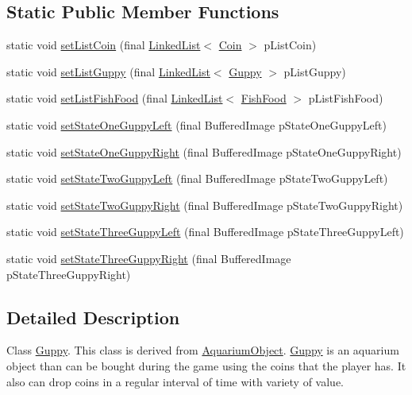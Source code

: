\subsection*{Static Public Member Functions}
\begin{DoxyCompactItemize}
\item 
static void \mbox{\hyperlink{class_guppy_a46004a42a6bea1e8fce0f26a61351d17}{set\+List\+Coin}} (final \mbox{\hyperlink{class_linked_list}{Linked\+List}}$<$ \mbox{\hyperlink{class_coin}{Coin}} $>$ p\+List\+Coin)
\item 
static void \mbox{\hyperlink{class_guppy_a87b2657fb98da613855fc016efa5e9d5}{set\+List\+Guppy}} (final \mbox{\hyperlink{class_linked_list}{Linked\+List}}$<$ \mbox{\hyperlink{class_guppy}{Guppy}} $>$ p\+List\+Guppy)
\item 
static void \mbox{\hyperlink{class_guppy_acc235342cdaa86c847ab01eb55043d7e}{set\+List\+Fish\+Food}} (final \mbox{\hyperlink{class_linked_list}{Linked\+List}}$<$ \mbox{\hyperlink{class_fish_food}{Fish\+Food}} $>$ p\+List\+Fish\+Food)
\item 
static void \mbox{\hyperlink{class_guppy_a9a8f6225f0482e0bd57a81f51310257c}{set\+State\+One\+Guppy\+Left}} (final Buffered\+Image p\+State\+One\+Guppy\+Left)
\item 
static void \mbox{\hyperlink{class_guppy_a49fdfd0f9d8e9eacbb032a0e16b67db0}{set\+State\+One\+Guppy\+Right}} (final Buffered\+Image p\+State\+One\+Guppy\+Right)
\item 
static void \mbox{\hyperlink{class_guppy_a7f916a9190171f6311d2404913fb2df6}{set\+State\+Two\+Guppy\+Left}} (final Buffered\+Image p\+State\+Two\+Guppy\+Left)
\item 
static void \mbox{\hyperlink{class_guppy_a17a6b8605b82965f1e6c290aa12da7a6}{set\+State\+Two\+Guppy\+Right}} (final Buffered\+Image p\+State\+Two\+Guppy\+Right)
\item 
static void \mbox{\hyperlink{class_guppy_ad66c660e52a40d1f10398c04b3a72d2c}{set\+State\+Three\+Guppy\+Left}} (final Buffered\+Image p\+State\+Three\+Guppy\+Left)
\item 
static void \mbox{\hyperlink{class_guppy_aff40345fa3a3ace95695a3bad8ebe1a5}{set\+State\+Three\+Guppy\+Right}} (final Buffered\+Image p\+State\+Three\+Guppy\+Right)
\end{DoxyCompactItemize}


\subsection{Detailed Description}
Class \mbox{\hyperlink{class_guppy}{Guppy}}. This class is derived from \mbox{\hyperlink{class_aquarium_object}{Aquarium\+Object}}. \mbox{\hyperlink{class_guppy}{Guppy}} is an aquarium object than can be bought during the game using the coins that the player has. It also can drop coins in a regular interval of time with variety of value. 

